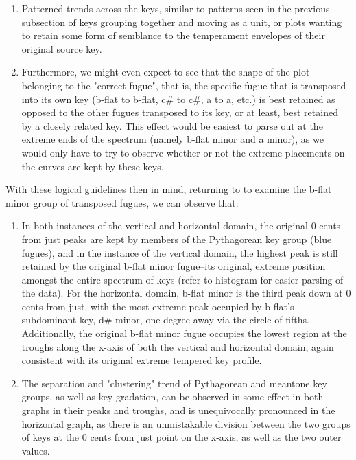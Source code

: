 \begin{enumerate}
\def\labelenumi{\arabic{enumi}.}
\tightlist
\item
  Patterned trends across the keys, similar to patterns seen in the
  previous subsection of keys grouping together and moving as a unit, or
  plots wanting to retain some form of semblance to the temperament
  envelopes of their original source key.
\item
  Furthermore, we might even expect to see that the shape of the plot
  belonging to the "correct fugue", that is, the specific fugue that is
  transposed into its own key (b-flat to b-flat, c\# to c\#, a to a,
  etc.) is best retained as opposed to the other fugues transposed to
  its key, or at least, best retained by a closely related key. This
  effect would be easiest to parse out at the extreme ends of the
  spectrum (namely b-flat minor and a minor), as we would only have to
  try to observe whether or not the extreme placements on the curves are
  kept by these keys.
\end{enumerate}

With these logical guidelines then in mind, returning to to examine the
b-flat minor group of transposed fugues, we can observe that:

\begin{enumerate}
\def\labelenumi{\arabic{enumi}.}
\tightlist
\item
  In both instances of the vertical and horizontal domain, the original
  0 cents from just peaks are kept by members of the Pythagorean key
  group (blue fugues), and in the instance of the vertical domain, the
  highest peak is still retained by the original b-flat minor
  fugue--its original, extreme position amongst the entire spectrum of
  keys (refer to histogram for easier parsing of the data). For the
  horizontal domain, b-flat minor is the third peak down at 0 cents from
  just, with the most extreme peak occupied by b-flat's subdominant key,
  d\# minor, one degree away via the circle of fifths. Additionally, the
  original b-flat minor fugue occupies the lowest region at the troughs
  along the x-axis of both the vertical and horizontal domain, again
  consistent with its original extreme tempered key profile.
\item
  The separation and "clustering" trend of Pythagorean and meantone key
  groups, as well as key gradation, can be observed in some effect in
  both graphs in their peaks and troughs, and is unequivocally
  pronounced in the horizontal graph, as there is an unmistakable
  division between the two groups of keys at the 0 cents from just point
  on the x-axis, as well as the two outer values.
\end{enumerate}

